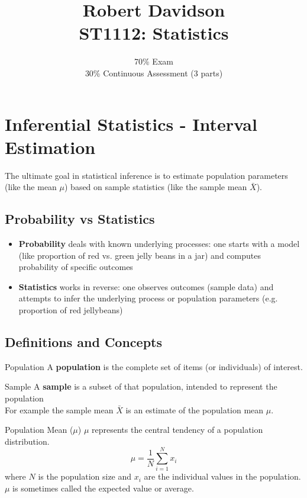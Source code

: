\documentclass[10pt]{extarticle}
\title{
Robert Davidson \\
\textbf{ST1112: Statistics}
}
\author{
70\% Exam\\
30\% Continuous Assessment (3 parts)
}
\date{}       %
\begin{document}
\maketitle
\pagebreak

\tableofcontents
\pagebreak

\section{Inferential Statistics - Interval Estimation}
The ultimate goal in statistical inference is to estimate population parameters (like the mean $\mu$) based on sample statistics (like the sample mean $\bar{X}$).
\subsection{Probability vs Statistics}
\begin{itemize}
    \item \textbf{Probability} deals with known underlying processes: one starts with a model (like proportion of red vs. green jelly beans in a jar) and computes probability of specific outcomes
    \item \textbf{Statistics} works in reverse: one observes outcomes (sample data) and attempts to infer the underlying process or population parameters (e.g. proportion of red jellybeans)
\end{itemize}
\subsection{Definitions and Concepts}

\begin{definitionbox}{Population}{}
    A \textbf{population} is the complete set of items (or individuals) of interest.
\end{definitionbox}

\begin{definitionbox}{Sample}{}
    A \textbf{sample} is a subset of that population, intended to represent the population\\

    For example the sample mean $\bar{X}$ is an estimate of the population mean $\mu$.
\end{definitionbox}

\begin{definitionbox}{Population Mean ($\mu$)}{}
    $\mu$ represents the central tendency of a population distribution.
    $$\mu = \frac{1}{N} \sum_{i=1}^{N} x_i$$
    where $N$ is the population size and $x_i$ are the individual values in the population.\\

    $\mu$ is sometimes called the expected value or average.
\end{definitionbox}
\end{document}
